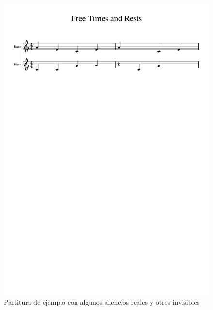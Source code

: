  \begin{figure}
 	\centering
 	\includegraphics[width=0.8\linewidth]{imagenes/scores/freetimerests.pdf}
 	\caption{Partitura de ejemplo con algunos silencios reales y otros invisibles}
 	\label{fig:rests_score}
 \end{figure}
 
